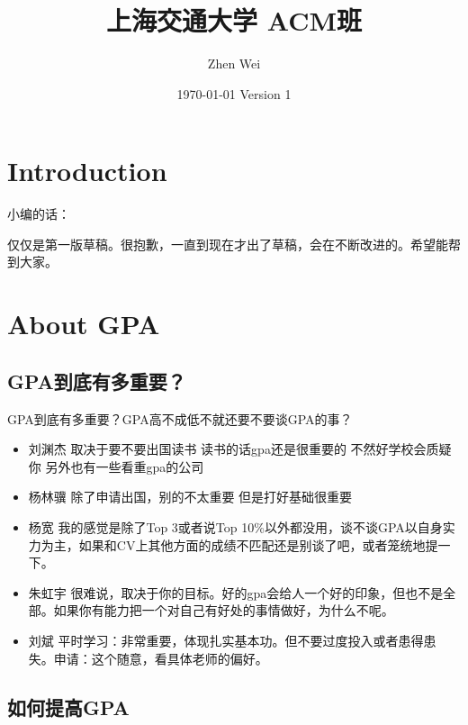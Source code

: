 \documentclass{vivid_layout}
\title{上海交通大学 ACM班}{\fontsize{37.5pt}{15pt}\selectfont 学长去哪儿}
\date{\color{white} \today{} \textbullet{} Version 1}
\author{Zhen Wei}{}
\begin{document}
\maketitle		%



\tableofcontents	%


\section{Introduction}
\addtocounter{section}{1}

小编的话：

仅仅是第一版草稿。很抱歉，一直到现在才出了草稿，会在不断改进的。希望能帮到大家。


\section{About GPA}
\addtocounter{section}{1}
\setcounter{subsection}{0}

\subsection{GPA到底有多重要？}
GPA到底有多重要？GPA高不成低不就还要不要谈GPA的事？

\begin{itemize}
\item  { 刘渊杰}  \quad 取决于要不要出国读书 读书的话gpa还是很重要的 不然好学校会质疑你 另外也有一些看重gpa的公司
\item  { 杨林骥}  \quad 除了申请出国，别的不太重要 但是打好基础很重要
\item  { 杨宽}  \quad 我的感觉是除了Top 3或者说Top 10\%以外都没用，谈不谈GPA以自身实力为主，如果和CV上其他方面的成绩不匹配还是别谈了吧，或者笼统地提一下。
\item  { 朱虹宇}  \quad 很难说，取决于你的目标。好的gpa会给人一个好的印象，但也不是全部。如果你有能力把一个对自己有好处的事情做好，为什么不呢。 
\item  { 刘斌}  \quad 平时学习：非常重要，体现扎实基本功。但不要过度投入或者患得患失。申请：这个随意，看具体老师的偏好。
\end{itemize}

\subsection{如何提高GPA}
\end{document}
